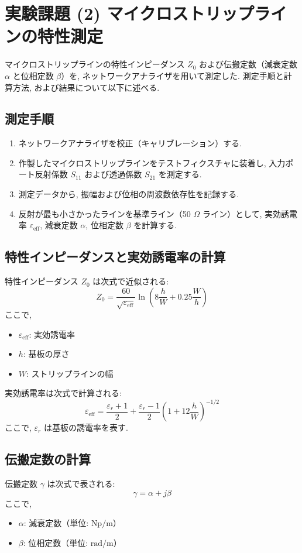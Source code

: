 \documentclass[a4paper, twocolumn]{article} %
\begin{document}
\section{実験課題 (2) マイクロストリップラインの特性測定}
マイクロストリップラインの特性インピーダンス \(Z_0\) および伝搬定数（減衰定数 \(\alpha\) と位相定数 \(\beta\)）を, ネットワークアナライザを用いて測定した. 測定手順と計算方法, および結果について以下に述べる.

\subsection{測定手順}
\begin{enumerate}
    \item ネットワークアナライザを校正（キャリブレーション）する.
    \item 作製したマイクロストリップラインをテストフィクスチャに装着し, 入力ポート反射係数 \(S_{11}\) および透過係数 \(S_{21}\) を測定する.
    \item 測定データから, 振幅および位相の周波数依存性を記録する.
    \item 反射が最も小さかったラインを基準ライン（50 \(\Omega\) ライン）として, 実効誘電率 \(\varepsilon_{\text{eff}}\), 減衰定数 \(\alpha\), 位相定数 \(\beta\) を計算する.
\end{enumerate}

\subsection{特性インピーダンスと実効誘電率の計算}
特性インピーダンス \(Z_0\) は次式で近似される:
\[
Z_0 = \frac{60}{\sqrt{\varepsilon_{\text{eff}}}} \ln \left( 8\frac{h}{W} + 0.25 \frac{W}{h} \right)
\]
ここで,
\begin{itemize}
    \item \(\varepsilon_{\text{eff}}\): 実効誘電率
    \item \(h\): 基板の厚さ
    \item \(W\): ストリップラインの幅
\end{itemize}

実効誘電率は次式で計算される:
\[
\varepsilon_{\text{eff}} = \frac{\varepsilon_r + 1}{2} + \frac{\varepsilon_r - 1}{2} \left( 1 + 12 \frac{h}{W} \right)^{-1/2}
\]
ここで, \(\varepsilon_r\) は基板の誘電率を表す.

\subsection{伝搬定数の計算}
伝搬定数 \(\gamma\) は次式で表される:
\[
\gamma = \alpha + j\beta
\]
ここで,
\begin{itemize}
    \item \(\alpha\): 減衰定数（単位: \(\text{Np/m}\)）
    \item \(\beta\): 位相定数（単位: \(\text{rad/m}\)）
\end{itemize}
\end{document}
